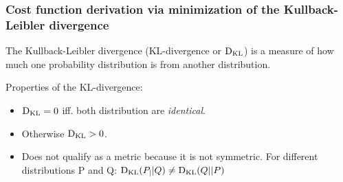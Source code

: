 \begin{frame}\frametitle{Cost function derivation via minimization of the Kullback-Leibler divergence}


The Kullback-Leibler divergence (KL-divergence or $\mathrm{D}_{\mathrm{KL}}$) is a measure of how much one probability distribution is from another distribution.

Properties of the KL-divergence:

\begin{itemize}
\item $\mathrm{D}_{\mathrm{KL}} = 0$ iff. both distribution are \emph{identical}.
\item Otherwise $\mathrm{D}_{\mathrm{KL}} > 0$.
\item Does not qualify as a metric because it is not symmetric. For different distributions P and Q: $\mathrm{D}_{\mathrm{KL}}(P_||Q) \ne \mathrm{D}_{\mathrm{KL}}(Q||P)$
\end{itemize}

\end{frame}

